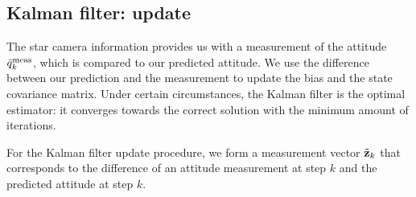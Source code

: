 \subsection{Kalman filter: update}

The star camera information provides us with a measurement of the attitude $\bar{q}^{\textrm{meas}}_{k}$, which is compared to our predicted attitude. We use the difference between our prediction and the measurement to update the bias and the state covariance matrix. Under certain circumstances, the Kalman filter is the optimal estimator: it converges towards the correct solution with the minimum amount of iterations.

For the Kalman filter update procedure, we form a measurement vector $\tilde{\textrm{\textbf{z}}}_{k}$ that corresponds to the difference of an attitude measurement at step $k$ and the predicted attitude at step $k$.

